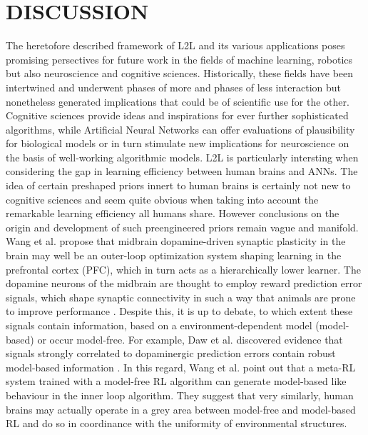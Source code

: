 \documentclass[letterpaper, 10 pt, conference]{ieeeconf}  %
\begin{document}
\section{DISCUSSION}
 
The heretofore described framework of L2L and its various applications poses promising persectives for future work in the fields 
of machine learning, robotics but also neuroscience and cognitive sciences. Historically, these fields have been intertwined and underwent
phases of more and phases of less interaction but nonetheless generated implications that could be of scientific use for the other. Cognitive 
sciences provide ideas and inspirations for ever further sophisticated algorithms, while Artificial Neural Networks can offer evaluations of 
plausibility for biological models or in turn stimulate new implications for neuroscience on the basis of well-working algorithmic models. L2L
is particularly intersting when considering the gap in learning efficiency between human brains and ANNs. The idea of certain preshaped 
priors innert to human brains is certainly not new to cognitive sciences and seem quite obvious when taking into account the remarkable 
learning efficiency all humans share. However conclusions on the origin and development of such preengineered priors remain vague
and manifold. Wang et al.\cite{wangPrefrontalCortexMetareinforcement2018} propose
that midbrain dopamine-driven synaptic plasticity in the brain may well be an outer-loop optimization system shaping 
learning in the prefrontal cortex (PFC), 
which in turn acts as a hierarchically lower learner. The dopamine neurons of the midbrain are thought to employ reward prediction 
error signals, which shape synaptic connectivity in such a way that animals are prone to improve performance 
\cite{montagueFrameworkMesencephalicDopamine1996}. Despite this, it is 
up to debate, to which extent these signals contain information, based on a environment-dependent model (model-based) or occur model-free.
For example, Daw et al.\cite{dawModelbasedInfluencesHumans2011} discovered evidence that signals strongly correlated to 
dopaminergic prediction errors contain robust model-based
information \cite{botvinickReinforcementLearningFast2019}\cite{dawModelbasedInfluencesHumans2011}.
In this regard, Wang et al.\cite{wangPrefrontalCortexMetareinforcement2018} point out that a meta-RL system trained with a model-free RL algorithm 
can generate model-based like behaviour in the inner loop algorithm. They suggest that very similarly, 
human brains may actually operate in a grey area between 
model-free and model-based RL and do so in coordinance with the uniformity of environmental structures. \newline
\end{document}
